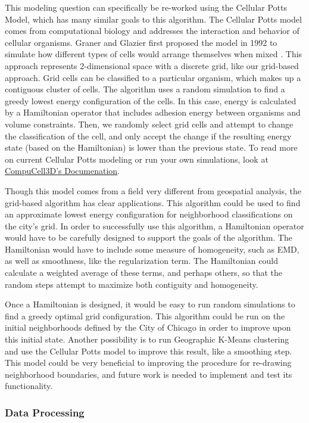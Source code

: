 \documentclass[times new roman,12pt]{article}
\begin{document}
This modeling question can specifically be re-worked using the Cellular Potts Model, which has many similar goals to this algorithm. The Cellular Potts model comes from computational biology and addresses the interaction and behavior of cellular organisms. Graner and Glazier first proposed the model in 1992 to simulate how different types of cells would arrange themselves when mixed \cite{graner1992simulation}. This approach represents 2-dimensional space with a discrete grid, like our grid-based approach. Grid cells can be classified to a particular organism, which makes up a contiguous cluster of cells. The algorithm uses a random simulation to find a greedy lowest energy configuration of the cells. In this case, energy is calculated by a Hamiltonian operator that includes adhesion energy between organisms and volume constraints. Then, we randomly select grid cells and attempt to change the classification of the cell, and only accept the change if the resulting energy state (based on the Hamiltonian) is lower than the previous state. To read more on current Cellular Potts modeling or run your own simulations, look at \href{http://www.compucell3d.org}{CompuCell3D's Documenation}.

Though this model comes from a field very different from geospatial analysis, the grid-based algorithm has clear applications. This algorithm could be used to find an approximate lowest energy configuration for neighborhood classifications on the city's grid. In order to successfully use this algorithm, a Hamiltonian operator would have to be carefully designed to support the goals of the algorithm. The Hamiltonian would have to include some measure of homogeneity, such as EMD, as well as smoothness, like the regularization term. The Hamiltonian could calculate a weighted average of these terms, and perhaps others, so that the random steps attempt to maximize both contiguity and homogeneity.

Once a Hamiltonian is designed, it would be easy to run random simulations to find a greedy optimal grid configuration. This algorithm could be run on the initial neighborhoods defined by the City of Chicago in order to improve upon this initial state. Another possibility is to run Geographic K-Means clustering and use the Cellular Potts model to improve this result, like a smoothing step. This model could be very beneficial to improving the procedure for re-drawing neighborhood boundaries, and future work is needed to implement and test its functionality. 

\subsubsection{Data Processing}
\end{document}
